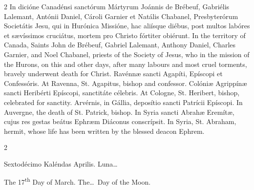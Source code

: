 \begin{paracol}{2}
In dicióne Canadénsi sanctórum Mártyrum Joánnis de Brébeuf, 
 Gabriélis Lalemant, Antónii Daniel, Cároli Garnier et Natális Chabanel, 
 Presbyterórum Societátis Jesu, qui in Hurónica Missióne, hac aliísque diébus, 
 post multos labóres et sævíssimos cruciátus, mortem pro Christo fórtiter 
 obiérunt.
\switchcolumn
{}
In the territory of Canada, Saints John de Brébeuf, Gabriel Lalemant, 
 Anthony Daniel, Charles Garnier, and Noel Chabanel, priests of the Society 
 of Jesus, who in the mission of the Hurons, on this and other days, after 
 many labours and most cruel torments, bravely underwent death for Christ.
\switchcolumn*
{}
Ravénnæ sancti Agapíti, Epíscopi et Confessóris.
\switchcolumn
{}
At Ravenna, St. Agapitus, bishop and confessor.
\switchcolumn*
{}
Colóniæ Agrippínæ sancti Heribérti Epíscopi, 
 sanctitáte célebris.
\switchcolumn
{}
At Cologne, St. Heribert, bishop, celebrated for sanctity.
\switchcolumn*
{}
Arvérnis, in Gállia, deposítio sancti Patrícii Epíscopi.
\switchcolumn
{}
In Auvergne, the death of St. Patrick, bishop.
\switchcolumn*
{}
In Syria sancti Abrahæ Eremítæ, cujus res 
 gestas beátus Ephræm Diáconus conscrípsit.
\switchcolumn
{}
In Syria, St. Abraham, hermit, whose life has been written by the blessed 
 deacon Ephrem.
\switchcolumn*
{}
\end{paracol}


\begin{paracol}{2}
\begin{center}{\color{gregoriocolor} Sextodécimo Kaléndas Aprilis. 
 Luna\dots\ }\end{center}
\switchcolumn
{}
\begin{center}{\color{gregoriocolor} The 17\textsuperscript{th} Day of March. 
 The\dots\ Day of the Moon.}\end{center}
\end{paracol}

